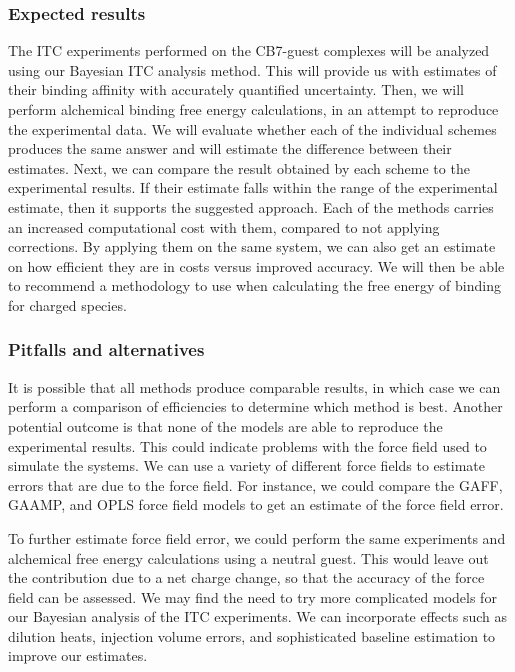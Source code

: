 \documentclass[10pt,final]{article}
\begin{document}
\subsubsection*{Expected results}
The ITC experiments performed on the CB7-guest complexes will be analyzed using our Bayesian ITC analysis method.
%
This will provide us with estimates of their binding affinity with accurately quantified uncertainty. 
%
Then, we will perform alchemical binding free energy calculations, in an attempt to reproduce the experimental data.
%
We will evaluate whether each of the individual schemes produces the same answer and will estimate the difference between their estimates. 
%
Next, we can compare the result obtained by each scheme to the experimental results. If their estimate falls within the range of the experimental estimate, then it supports the suggested approach.
%
Each of the methods carries an increased computational cost with them, compared to not applying corrections.
%
By applying them on the same system, we can also get an estimate on how efficient they are in costs versus improved accuracy.
%
We will then be able to recommend a methodology to use when calculating the free energy of binding for charged species.


\subsubsection*{Pitfalls and alternatives}

It is possible that all methods produce comparable results, in which case we can perform a comparison of efficiencies to determine which method is best.
%
Another potential outcome is that none of the models are able to reproduce the experimental results.
%
This could indicate problems with the force field used to simulate the systems.
%
We can use a variety of different force fields to estimate errors that are due to the force field.
%
For instance, we could compare the GAFF\autocite{Wang2004a}, GAAMP\autocite{Huang2013a}, and OPLS\autocite{Schroedinger2014b} force field models to get an estimate of the force field error. 

To further estimate force field error, we could perform the same experiments and alchemical free energy calculations using a neutral guest. 
%
This would leave out the contribution due to a net charge change, so that the accuracy of the force field can be assessed.
%
We may find the need to try more complicated models for our Bayesian analysis of the ITC experiments.
%
We can incorporate effects such as dilution heats, injection volume errors, and sophisticated baseline estimation to improve our estimates.
\end{document}
